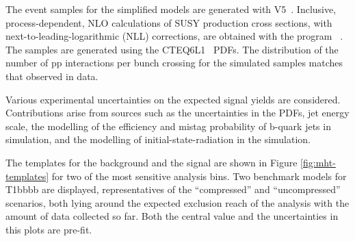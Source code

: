 The event samples for the simplified models are generated 
with \MADGRAPH V5~\cite{madgraph}.
Inclusive, process-dependent, NLO
calculations of SUSY production cross sections, with
next-to-leading-logarithmic (NLL) corrections, are obtained with the
program \PROSPINO~\cite{Beenakker:1996ch, PhysRevD.80.095004,PhysRevLett.102.111802, PhysRevD.80.095004, 1126-6708-2009-12-041,
  doi:10.1142/S0217751X11053560, susy-nlo-nll}. The samples are
generated using the CTEQ6L1~\cite{Pumplin:2002vw} PDFs. The
distribution of the number of pp interactions per bunch crossing for
the simulated samples matches that observed in data.

Various experimental uncertainties on the expected signal yields are
considered. Contributions arise from sources such as the uncertainties in the PDFs, jet energy
scale, the modelling of the efficiency and mistag probability of
b-quark jets in simulation, and the modelling of initial-state-radiation in the simulation.

The \mht templates for the background and the signal are shown in Figure \ref{fig:mht-templates} for two of the most sensitive analysis bins.
Two benchmark models for T1bbbb are displayed, representatives of the ``compressed'' and ``uncompressed'' scenarios, 
both lying around the expected exclusion reach of the analysis with the amount of data collected so far. 
Both the central value and the uncertainties in this plots are pre-fit.


